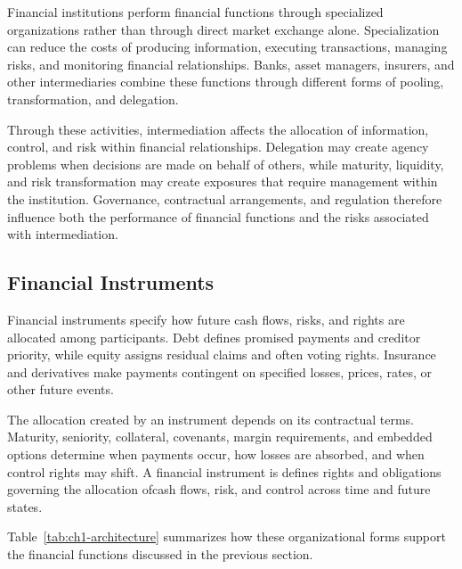 Financial institutions perform financial functions through specialized organizations rather than through direct market exchange alone. Specialization can reduce the costs of producing information, executing transactions, managing risks, and monitoring financial relationships. Banks, asset managers, insurers, and other intermediaries combine these functions through different forms of pooling, transformation, and delegation.

Through these activities, intermediation affects the allocation of information, control, and risk within financial relationships. Delegation may create agency problems when decisions are made on behalf of others, while maturity, liquidity, and risk transformation may create exposures that require management within the institution. Governance, contractual arrangements, and regulation therefore influence both the performance of financial functions and the risks associated with intermediation.

\subsection{Financial Instruments}

Financial instruments specify how future cash flows, risks, and rights are allocated among participants. Debt defines promised payments and creditor priority, while equity assigns residual claims and often voting rights. Insurance and derivatives make payments contingent on specified losses, prices, rates, or other future events.

The allocation created by an instrument depends on its contractual terms. Maturity, seniority, collateral, covenants, margin requirements, and embedded options determine when payments occur, how losses are absorbed, and when control rights may shift. A financial instrument is defines rights and obligations governing the allocation ofcash flows, risk, and control across time and future states.

\par\medskip
\noindent
Table~\ref{tab:ch1-architecture} summarizes how these organizational forms support the financial functions discussed in the previous section.

